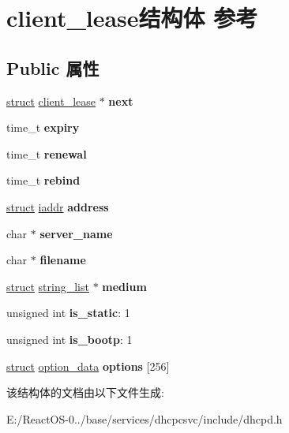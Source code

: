 \hypertarget{structclient__lease}{}\section{client\+\_\+lease结构体 参考}
\label{structclient__lease}
\subsection*{Public 属性}
\begin{DoxyCompactItemize}
\item 
\mbox{\label{structclient__lease_a82932ad070bdddf65ddd8191531cd6ee}} 
\hyperlink{interfacestruct}{struct} \hyperlink{structclient__lease}{client\+\_\+lease} $\ast$ {\bfseries next}
\item 
\mbox{\label{structclient__lease_aea4285e4daba2db7036dda263e9fca6b}} 
time\+\_\+t {\bfseries expiry}
\item 
\mbox{\label{structclient__lease_aab64f931ad9b73dc7940ba131b3a3264}} 
time\+\_\+t {\bfseries renewal}
\item 
\mbox{\label{structclient__lease_ac3aa0f3ba37bf9ac29482cc645c02b65}} 
time\+\_\+t {\bfseries rebind}
\item 
\mbox{\label{structclient__lease_a25a9c3beb871709e70ac45b987a5394d}} 
\hyperlink{interfacestruct}{struct} \hyperlink{structiaddr}{iaddr} {\bfseries address}
\item 
\mbox{\label{structclient__lease_a41b90bcb187f27b67a5ef93cb2ebc91e}} 
char $\ast$ {\bfseries server\+\_\+name}
\item 
\mbox{\label{structclient__lease_a27f5a561f88b29a5a1992e09385d41a4}} 
char $\ast$ {\bfseries filename}
\item 
\mbox{\label{structclient__lease_a07b1f0fd44198b3b869864b2135c2cef}} 
\hyperlink{interfacestruct}{struct} \hyperlink{structstring__list}{string\+\_\+list} $\ast$ {\bfseries medium}
\item 
\mbox{\label{structclient__lease_a056edc7978dd738e48107b1794d35691}} 
unsigned int {\bfseries is\+\_\+static}\+: 1
\item 
\mbox{\label{structclient__lease_a7aef444e32b3689f9ab914a5725392ff}} 
unsigned int {\bfseries is\+\_\+bootp}\+: 1
\item 
\mbox{\label{structclient__lease_a1f60ee2451b7db2262557269f6429245}} 
\hyperlink{interfacestruct}{struct} \hyperlink{structoption__data}{option\+\_\+data} {\bfseries options} \mbox{[}256\mbox{]}
\end{DoxyCompactItemize}


该结构体的文档由以下文件生成\+:\begin{DoxyCompactItemize}
\item 
E\+:/\+React\+O\+S-\/0../base/services/dhcpcsvc/include/dhcpd.\+h\end{DoxyCompactItemize}
